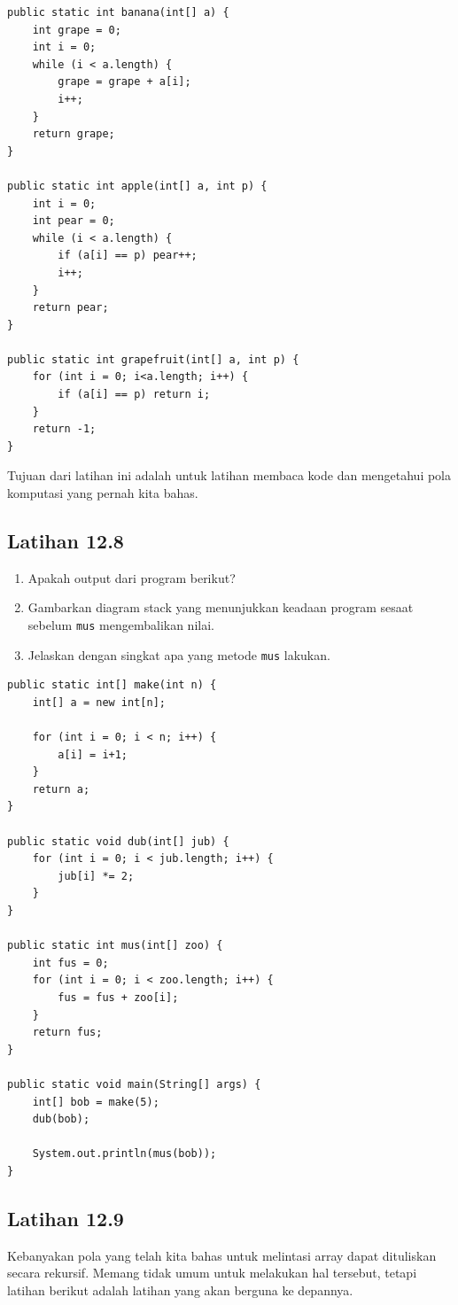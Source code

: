 \begin{lstlisting}
public static int banana(int[] a) {
    int grape = 0;
    int i = 0;
    while (i < a.length) {
        grape = grape + a[i];
        i++;
    }
    return grape;
}

public static int apple(int[] a, int p) {
    int i = 0;
    int pear = 0;
    while (i < a.length) {
        if (a[i] == p) pear++;
        i++;
    }
    return pear;
}

public static int grapefruit(int[] a, int p) {
    for (int i = 0; i<a.length; i++) {
        if (a[i] == p) return i;
    }
    return -1;
}
\end{lstlisting}
Tujuan dari latihan ini adalah untuk latihan membaca kode dan mengetahui pola komputasi yang pernah kita bahas.



\subsection{Latihan 12.8}
\begin{enumerate}

\item Apakah output dari program berikut?

\item Gambarkan diagram stack yang menunjukkan keadaan program sesaat sebelum {\tt mus} mengembalikan nilai.

\item Jelaskan dengan singkat apa yang metode {\tt mus} lakukan.
\end{enumerate}

\begin{lstlisting}
public static int[] make(int n) {
    int[] a = new int[n];

    for (int i = 0; i < n; i++) {
        a[i] = i+1;
    }
    return a;
}

public static void dub(int[] jub) {
    for (int i = 0; i < jub.length; i++) {
        jub[i] *= 2;
    }
}

public static int mus(int[] zoo) {
    int fus = 0;
    for (int i = 0; i < zoo.length; i++) {
        fus = fus + zoo[i];
    }
    return fus;
}

public static void main(String[] args) {
    int[] bob = make(5);
    dub(bob);

    System.out.println(mus(bob));
}
\end{lstlisting}



\subsection{Latihan 12.9}
Kebanyakan pola yang telah kita bahas untuk melintasi array dapat dituliskan secara rekursif. Memang tidak umum untuk melakukan hal tersebut, tetapi latihan berikut adalah latihan yang akan berguna ke depannya.

